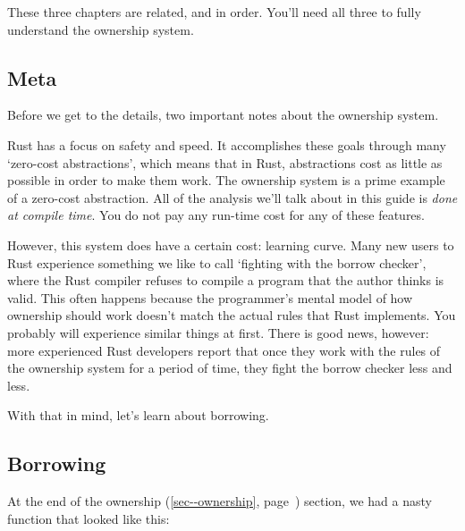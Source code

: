 \documentclass[a4paper,]{book}
\renewcommand*{\hypertarget}[3][\ar]{%
  \def\ar{#2}%
  \label{#1}%
  #3}
\renewcommand*{\hyperlink}[2]{%
 #2 (\autoref{#1}, page~\pageref{#1})}
\begin{document}
These three chapters are related, and in order. You'll need all three to
fully understand the ownership system.

\subsection{Meta}\label{meta-1}

Before we get to the details, two important notes about the ownership
system.

Rust has a focus on safety and speed. It accomplishes these goals
through many `zero-cost abstractions', which means that in Rust,
abstractions cost as little as possible in order to make them work. The
ownership system is a prime example of a zero-cost abstraction. All of
the analysis we'll talk about in this guide is \emph{done at compile
time}. You do not pay any run-time cost for any of these features.

However, this system does have a certain cost: learning curve. Many new
users to Rust experience something we like to call `fighting with the
borrow checker', where the Rust compiler refuses to compile a program
that the author thinks is valid. This often happens because the
programmer's mental model of how ownership should work doesn't match the
actual rules that Rust implements. You probably will experience similar
things at first. There is good news, however: more experienced Rust
developers report that once they work with the rules of the ownership
system for a period of time, they fight the borrow checker less and
less.

With that in mind, let's learn about borrowing.

\hypertarget{borrowing}{\subsection{Borrowing}\label{borrowing}}

At the end of the \protect\hyperlink{sec--ownership}{ownership} section,
we had a nasty function that looked like this:
\end{document}
